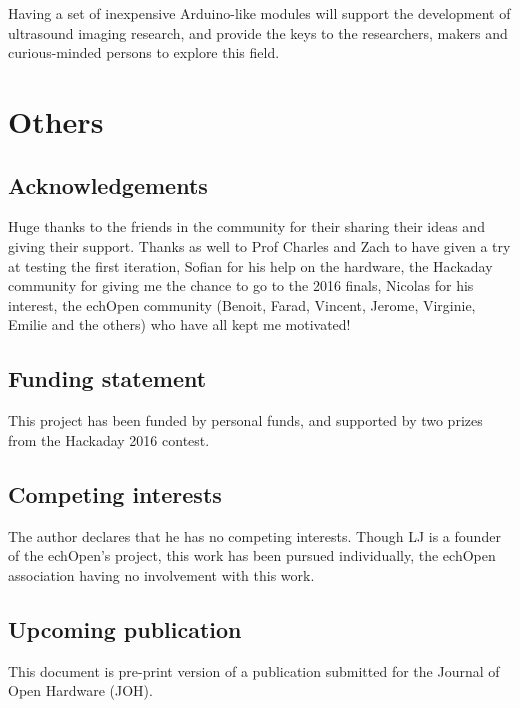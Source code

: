 \documentclass[letterpaper, 10 pt, conference]{ieeeconf} %
\begin{document}
Having a set of inexpensive Arduino-like modules will support the development of ultrasound imaging research, and provide the keys to the researchers, makers and curious-minded persons to explore this field.



\section*{Others}

\subsection*{Acknowledgements}

Huge thanks to the friends in the community for their sharing their ideas and giving their support. Thanks as well to Prof Charles and Zach to have given a try at testing the first iteration, Sofian for his help on the hardware, the Hackaday community for giving me the chance to go to the 2016 finals, Nicolas for his interest, the echOpen community (Benoit, Farad, Vincent, Jerome, Virginie, Emilie and the others) who have all kept me motivated!

\subsection*{Funding statement}

This project has been funded by personal funds, and supported by two prizes from the Hackaday 2016 contest.

\subsection*{Competing interests}

The author declares that he has no competing interests. Though LJ is a founder of the echOpen's project, this work has been pursued individually, the echOpen association having no involvement with this work.

\subsection*{Upcoming publication}

This document is pre-print version of a publication submitted for the Journal of Open Hardware (JOH).

\addtolength{\textheight}{-11cm}  %
\end{document}
